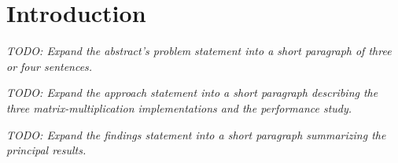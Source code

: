 \section{Introduction}

\textit{TODO: Expand the abstract's problem statement into a short paragraph
of three or four sentences.}

\textit{TODO: Expand the approach statement into a short paragraph describing
the three matrix-multiplication implementations and the performance study.}

\textit{TODO: Expand the findings statement into a short paragraph summarizing
the principal results.}
